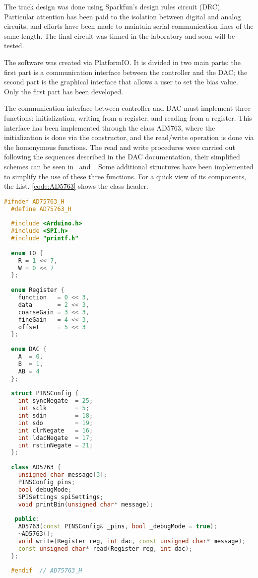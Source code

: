 The track design was done using Sparkfun’s design rules circuit (DRC). Particular attention has been paid to the isolation between digital and analog circuits, and efforts have been made to maintain serial communication lines of the same length. The final circuit was tinned in the laboratory and soon will be tested.

The software was created via PlatformIO. It is divided in two main parts: the first part is a communication interface between the controller and the DAC; the second part is the graphical interface that allows a user to set the bias value. Only the first part has been developed.


The communication interface between controller and DAC must implement three functions: initialization, writing from a register, and reading from a register. This interface has been implemented through the class AD5763, where the initialization is done via the constructor, and the read/write operation is done via the homonymous functions. The read and write procedures were carried out following the sequences described in the DAC documentation, their simplified schemes can be seen in~ and~. Some additional structures have been implemented to simplify the use of these three functions.
For a quick view of its components, the List. \ref{code:AD5763} shows the class header.
\begin{lstlisting}[language=c++, gobble=2, label=code:AD5763]
  #ifndef AD75763_H
  #define AD75763_H
  
  #include <Arduino.h>
  #include <SPI.h>
  #include "printf.h"
  
  enum IO {
    R = 1 << 7,
    W = 0 << 7
  };
  
  enum Register {
    function   = 0 << 3,
    data       = 2 << 3,
    coarseGain = 3 << 3,
    fineGain   = 4 << 3,
    offset     = 5 << 3
  };
  
  enum DAC {
    A  = 0,
    B  = 1,
    AB = 4
  };
  
  struct PINSConfig {
    int syncNegate  = 25;
    int sclk        = 5;
    int sdin        = 18;
    int sdo         = 19;
    int clrNegate   = 16;
    int ldacNegate  = 17;
    int rstinNegate = 21;
  };
  
  class AD5763 {
    unsigned char message[3];
    PINSConfig pins;
    bool debugMode;
    SPISettings spiSettings;
    void printBin(unsigned char* message);
  
   public:
    AD5763(const PINSConfig& _pins, bool _debugMode = true);
    ~AD5763();
    void write(Register reg, int dac, const unsigned char* message);
    const unsigned char* read(Register reg, int dac);
  };
  
  #endif  // AD75763_H
\end{lstlisting}



